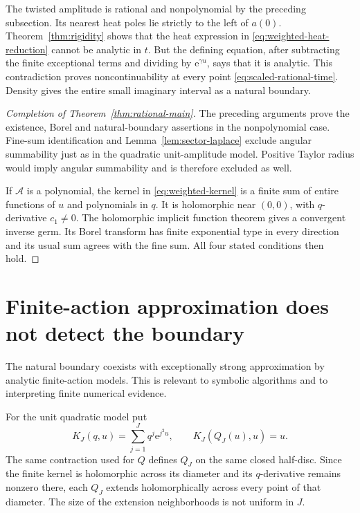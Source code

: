 \documentclass[11pt,a4paper]{article}
\numberwithin{equation}{section}
\theoremstyle{definition}
\theoremstyle{remark}
\newcommand{\ee}{\mathrm e}
\newcommand{\rationalamp}{\mathcal A}
\begin{document}
The twisted amplitude is rational and nonpolynomial by the preceding
subsection.  Its nearest heat poles lie strictly to the left of $a(0)$.
Theorem~\ref{thm:rigidity} shows that the heat expression in
\eqref{eq:weighted-heat-reduction} cannot be analytic in $t$.
But the defining equation, after subtracting the finite exceptional
terms and dividing by $\ee^{\gamma u}$, says that it is analytic.
This contradiction proves noncontinuability at every point
\eqref{eq:scaled-rational-time}.  Density gives the entire small
imaginary interval as a natural boundary.

\begin{proof}[Completion of Theorem~\ref{thm:rational-main}]
The preceding arguments prove the existence, Borel and natural-boundary
assertions in the nonpolynomial case.  Fine-sum identification and
Lemma~\ref{lem:sector-laplace} exclude angular summability just as in
the quadratic unit-amplitude model.  Positive Taylor radius would imply
angular summability and is therefore excluded as well.

If $\rationalamp$ is a polynomial, the kernel in
\eqref{eq:weighted-kernel} is a finite sum of entire functions of $u$
and polynomials in $q$.  It is holomorphic near $(0,0)$, with
$q$-derivative $c_1\ne0$.  The holomorphic implicit function theorem
gives a convergent inverse germ.  Its Borel transform has finite
exponential type in every direction and its usual sum agrees with the
fine sum.  All four stated conditions then hold.
\end{proof}

\section{Finite-action approximation does not detect the boundary}
\label{sec:truncation}

The natural boundary coexists with exceptionally strong approximation by
analytic finite-action models.  This is relevant to symbolic algorithms
and to interpreting finite numerical evidence.

For the unit quadratic model put
\[
 K_J(q,u)=\sum_{j=1}^Jq^j\ee^{j^2u},
 \qquad K_J(Q_J(u),u)=u.
\]
The same contraction used for $Q$ defines $Q_J$ on the same closed
half-disc.  Since the finite kernel is holomorphic across its diameter
and its $q$-derivative remains nonzero there, each $Q_J$ extends
holomorphically across every point of that diameter.  The size of the
extension neighborhoods is not uniform in $J$.
\end{document}

